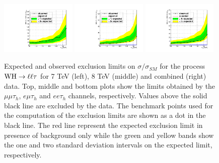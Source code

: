 \begin{figure}
\begin{center}
  \includegraphics[width=0.32\textwidth]{4_Analisys/pics/limits/eet/eet_7TeV.pdf}
  \includegraphics[width=0.32\textwidth]{4_Analisys/pics/limits/eet/eet_8TeV.pdf}
  \includegraphics[width=0.32\textwidth]{4_Analisys/pics/limits/eet/eet.pdf} \\
  \caption{Expected and observed exclusion limits on $\sigma/\sigma_{SM}$ for the process $\mathrm{W}\mathrm{H} \rightarrow \ell \ell \tau$ for 7 TeV (left), 8 TeV (middle) and combined (right) data. Top, middle and bottom plots show the limits obtained by the $\mu\mu\tau_h$, $e\mu\tau_h$ and $ee\tau_h$ channels, respectively. Values above the solid black line are excluded by the data. The benchmark points used for the computation of the exclusion limits are shown as a dot in the black line. The red line represent the expected exclusion limit in presence of background only while the green and yellow bands show the one and two standard deviation intervals on the expected limit, respectively.}
  \label{fig:llt_chan_limits}
\end{center}
\end{figure}

